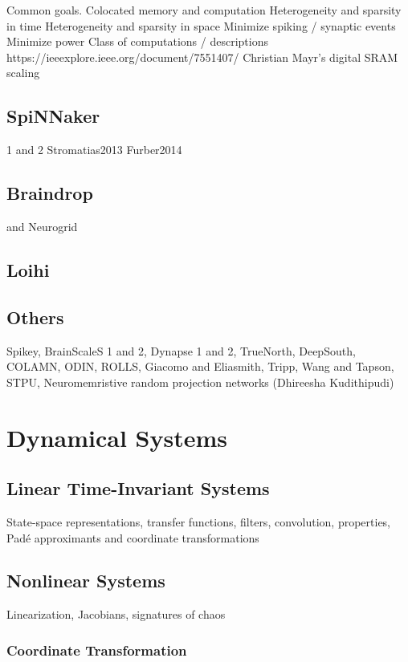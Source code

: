 Common goals.
Colocated memory and computation
Heterogeneity and sparsity in time
Heterogeneity and sparsity in space
Minimize spiking / synaptic events
Minimize power
Class of computations / descriptions
https://ieeexplore.ieee.org/document/7551407/ Christian Mayr's digital SRAM scaling 

\subsection{SpiNNaker}

1 and 2
Stromatias2013
Furber2014

\subsection{Braindrop}

and Neurogrid

\subsection{Loihi}

\subsection{Others}

Spikey, BrainScaleS 1 and 2, Dynapse 1 and 2, TrueNorth, DeepSouth, COLAMN, ODIN, ROLLS, Giacomo and Eliasmith, Tripp, Wang and Tapson, STPU, Neuromemristive random projection networks (Dhireesha Kudithipudi)


\section{Dynamical Systems}

\subsection{Linear Time-Invariant Systems}

State-space representations, transfer functions, filters, convolution, properties, Pad\'e approximants and coordinate transformations

\subsection{Nonlinear Systems}

Linearization, Jacobians, signatures of chaos

\subsubsection{Coordinate Transformation}

